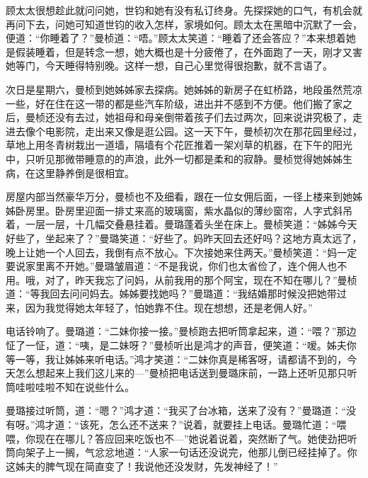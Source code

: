 \par 顾太太很想趁此就问问她，世钧和她有没有私订终身。先探探她的口气，有机会就再问下去，问她可知道世钧的收入怎样，家境如何。顾太太在黑暗中沉默了一会，便道：“你睡着了？”曼桢道：“唔。”顾太太笑道：“睡着了还会答应？”本来想着她是假装睡着，但是转念一想，她大概也是十分疲倦了，在外面跑了一天，刚才又害她等门，今天睡得特别晚。这样一想，自己心里觉得很抱歉，就不言语了。
\par 次日是星期六，曼桢到她姊姊家去探病。她姊姊的新房子在虹桥路，地段虽然荒凉一些，好在住在这一带的都是些汽车阶级，进出并不感到不方便。他们搬了家之后，曼桢还没有去过，她祖母和母亲倒带着孩子们去过两次，回来说讲究极了，走进去像个电影院，走出来又像是逛公园。这一天下午，曼桢初次在那花园里经过，草地上用冬青树栽出一道墙，隔墙有个花匠\KouZi \KouZi \KouZi 推着一架刈草的机器，在下午的阳光中，只听见那微带睡意的\KouZi \KouZi 的声浪，此外一切都是柔和的寂静。曼桢觉得她姊姊生病，在这里静养倒是很相宜。
\par 房屋内部当然豪华万分，曼桢也不及细看，跟在一位女佣后面，一径上楼来到她姊姊卧房里。卧房里迎面一排丈来高的玻璃窗，紫水晶似的薄纱窗帘，人字式斜吊着，一层一层，十几幅交叠悬挂着。曼璐蓬着头坐在床上。曼桢笑道：“姊姊今天好些了，坐起来了？”曼璐笑道：“好些了。妈昨天回去还好吗？这地方真太远了，晚上让她一个人回去，我倒有点不放心。下次接她来住两天。”曼桢笑道：“妈一定要说家里离不开她。”曼璐皱眉道：“不是我说，你们也太省俭了，连个佣人也不用。哦，对了，昨天我忘了问妈，从前我用的那个阿宝，现在不知在哪儿？”曼桢道：“等我回去问问妈去。姊姊要找她吗？”曼璐道：“我结婚那时候没把她带过来，因为我觉得她太年轻了，怕她靠不住。现在想想，还是老佣人好。”
\par 电话铃响了。曼璐道：“二妹你接一接。”曼桢跑去把听筒拿起来，道：“喂？”那边怔了一怔，道：“咦，是二妹呀？”曼桢听出是鸿才的声音，便笑道：“嗳。姊夫你等一等，我让姊姊来听电话。”鸿才笑道：“二妹你真是稀客呀，请都请不到的，今天怎么想起来上我们这儿来的—”曼桢把电话送到曼璐床前，一路上还听见那只听筒哇啦哇啦不知在说些什么。
\par 曼璐接过听筒，道：“嗯？”鸿才道：“我买了台冰箱，送来了没有？”曼璐道：“没有呀。”鸿才道：“该死，怎么还不送来？”说着，就要挂上电话。曼璐忙道：“喂喂，你现在在哪儿？答应回来吃饭也不—”她说着说着，突然断了气。她使劲把听筒向架子上一搁，气忿忿地道：“人家一句话还没说完，他那儿倒已经挂掉了。你这姊夫的脾气现在简直变了！我说他还没发财，先发神经了！”
